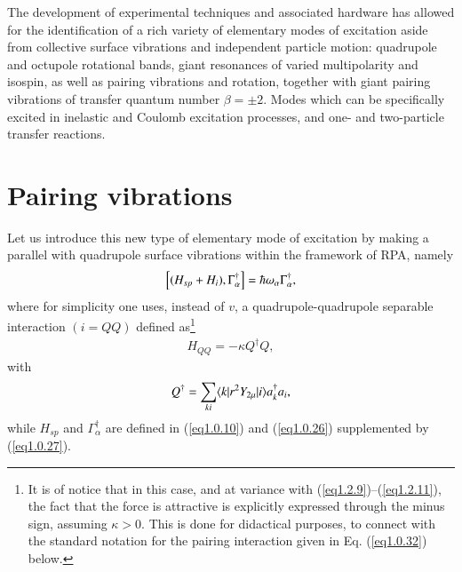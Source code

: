 The development of experimental techniques and associated hardware has allowed for the identification of a rich variety of elementary modes of excitation aside from collective surface vibrations  and independent particle motion: quadrupole and octupole rotational bands, giant resonances of varied multipolarity and isospin, as well as pairing vibrations and rotation, together with giant pairing vibrations of transfer quantum number $\beta=\pm 2$. Modes which can be specifically excited in inelastic and Coulomb excitation processes, and one- and two-particle transfer reactions.
\section{Pairing vibrations}\label{Sect1.3}
Let us introduce this new type of elementary mode of excitation by making a parallel with quadrupole surface vibrations within the framework of RPA, namely
\begin{align}\label{eq1.0.29}
\left[(H_{sp}+H_i),\Gamma_{\alpha}^\dagger\right]=\hbar\omega_\alpha\Gamma_{\alpha}^\dagger, \idx{Pairing vibrations!RPA relations}
\end{align}
where for simplicity one uses, instead of $v$, a quadrupole-quadrupole separable interaction $(i=QQ)$ defined as\footnote{It is of notice that in this case, and at variance with (\ref{eq1.2.9})--(\ref{eq1.2.11}), the fact that the force is attractive is explicitly expressed through the minus sign, assuming $\kappa>0$. This is done for didactical purposes, to connect with the standard notation for the pairing interaction given in Eq. (\ref{eq1.0.32}) below.}
\begin{align}\label{eq1.0.30}
H_{QQ}=-\kappa Q^\dagger Q,
\end{align}
with 
\begin{align}\label{eq1.0.31}
 Q^\dagger=\sum_{ki}\langle {k|r^2 Y_{2\mu}|i} \rangle a^\dagger_k a_i,
\end{align}
while $H_{sp}$ and $\Gamma^\dagger_\alpha$ are defined in (\ref{eq1.0.10}) and (\ref{eq1.0.26}) supplemented by (\ref{eq1.0.27}).

